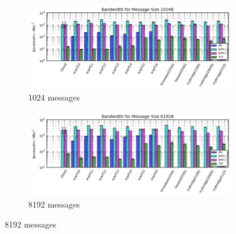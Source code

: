 \documentclass{article}
\begin{document}
            \begin{figure}[H]
                \centering
                \begin{subfigure}{\textwidth}
                  \centering
                    \includegraphics[width=\textwidth]{compare_bandwidth-hostgroup_1024}
                  \caption{1024\si{\byte} messages}
                \end{subfigure}

                \begin{subfigure}{\textwidth}
                  \centering
                     \includegraphics[width=\textwidth]{compare_bandwidth-hostgroup_8192}
                  \caption{8192\si{\byte} messages}
                \end{subfigure}
             \end{figure}
\end{document}
